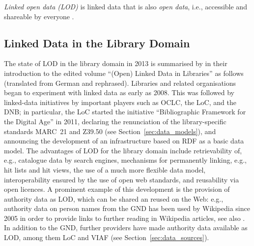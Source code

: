 \par\medskip
\emph{Linked open data (LOD)} is linked data that is also \emph{open data},
i.e., accessible and shareable by everyone \autocite{WikiLinkedData}.




\subsection{Linked Data in the Library Domain}

The state of LOD in the library domain in 2013 is summarised by \textcite{Pohl2013}
in their introduction to the edited volume \enquote{(Open) Linked Data in Libraries} \autocite{Danowski2013}
as follows (translated from German and rephrased). Libraries and related organisations
began to experiment with linked data as early as 2008.
This was followed by linked-data initiatives by important players such as
OCLC, the \gls{LoC}, and the \gls{DNB};
in particular, the \gls{LoC} started the initiative \enquote{Bibliographic Framework for the Digital Age} in 2011,
%
%
declaring the renunciation of the library-specific standards \gls{MARC}~21 and \gls{Z39.50} (see Section~\ref{sec:data_models}),
and announcing the development of an infrastructure based on \gls{RDF} as a basic data model. The advantages of LOD for the library domain include
retrievability of, e.g., catalogue data by search engines,
mechanisms for permanently linking, e.g., hit lists and hit views,
the use of a much more flexible data model,
interoperability ensured by the use of open web standards,
and reusability via open licences.
A prominent example of this development is the provision of authority data as LOD,
which can be shared an reused on the Web:
e.g., authority data on person names from the \gls{GND} has been used by Wikipedia since 2005
in order to provide links to further reading in Wikipedia articles, see also \autocite{Hengel2005}.
In addition to the \gls{GND}, further providers have made authority data available as LOD,
among them \gls{LoC} and \gls{VIAF} (see Section~\ref{sec:data_sources}).

